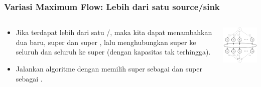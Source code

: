 \begin{frame}
\frametitle{Variasi Maximum Flow: Lebih dari satu source/sink}
\begin{minipage}[\textheight]{\textwidth}
\begin{columns}[T]
\begin{column}{0.55\textwidth}
\begin{itemize}[]
  \item Jika terdapat lebih dari satu \fsource/\fsink, maka kita dapat menambahkan dua \fnode baru, super \fsource dan super \fsink, lalu menghubungkan super \fsource ke seluruh \fsource dan seluruh \fsink ke super \fsink (dengan kapasitas tak terhingga).
  \item Jalankan algoritme \fmaxflow dengan memilih super \fsource sebagai \fsource dan super \fsink sebagai \fsink.
\end{itemize}
\end{column}
\begin{column}{0.45\textwidth}
\includegraphics[width=5cm]{asset/multiple-source-sink.png}
\end{column}
\end{columns}
\end{minipage}
\end{frame}


